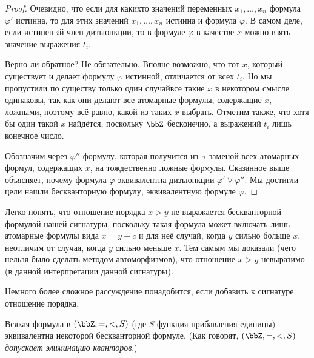 \begin{proof}
Очевидно, что если для каких\д то значений переменных
$x_1,\dots,x_n$ формула
$\varphi'$ истинна, то для этих значений
$x_1,\dots,x_n$ истинна и формула
$\varphi$. В самом деле, если истинен
$i$\д й член дизъюнкции, то в формуле $\varphi$ в качестве $x$
можно взять значение выражения $t_i$.

Верно ли обратное? Не обязательно. Вполне возможно, что тот $x$,
который существует и делает формулу $\varphi$ истинной,
отличается от всех $t_i$. Но мы пропустили по существу только
один случай\т все такие $x$ в некотором смысле одинаковы, так
как они делают все атомарные формулы, содержащие $x$, ложными,
поэтому всё равно, какой из таких $x$ выбрать. Отметим также,
что хотя бы один такой $x$ найдётся, поскольку $\bbZ$
бесконечно, а выражений $t_i$ лишь конечное число.

Обозначим через $\varphi''$ формулу, которая получится из~$\tau$
заменой всех атомарных формул, содержащих $x$, на тождественно
ложные формулы. Сказанное выше объясняет, почему формула $\varphi$
эквивалентна дизъюнкции $\varphi'\lor\varphi''$. Мы достигли цели
\т нашли бескванторную формулу, эквивалентную формуле $\varphi$.
\end{proof}

Легко понять, что отношение порядка $x>y$ не выражается
бескванторной формулой нашей сигнатуры, поскольку такая формула
может включать лишь атомарные формулы вида $x=y+c$ и для неё
случай, когда $y$ сильно больше $x$, неотличим от случая, когда
$y$ сильно меньше $x$. Тем самым мы доказали (чего нельзя было
сделать методом автоморфизмов), что отношение $x>y$ невыразимо
(в данной интерпретации данной сигнатуры).

Немного более сложное рассуждение понадобится, если добавить
к сигнатуре отношение порядка.

\begin{theorem}
%
        \label{successor-order-elimination}%
Всякая формула в $(\bbZ,{=},{<}, S)$ (где $S$\т
функция прибавления единицы) эквивалентна некоторой
бескванторной формуле. (Как говорят, $(\bbZ,{=},{<},
S)$ \emph{допускает элиминацию кванторов}.)%
\end{theorem}

